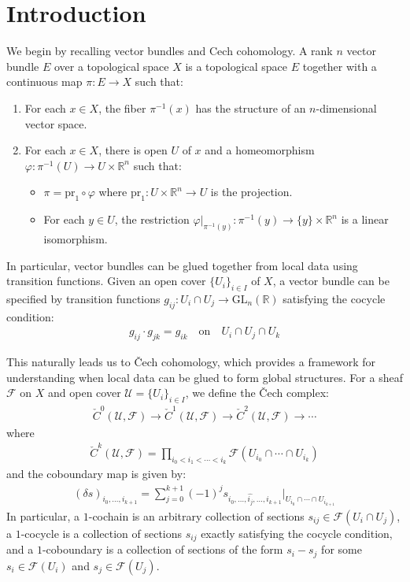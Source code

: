 \documentclass[12pt]{article}
\begin{document}
\section{Introduction}
We begin by recalling vector bundles and Cech cohomology. A rank $n$ vector bundle $E$ over a topological space $X$ is a topological space $E$ together with a continuous map $\pi: E \to X$ such that:
\begin{enumerate}
    \item For each $x \in X$, the fiber $\pi^{-1}(x)$ has the structure of an $n$-dimensional vector space.
    \item For each $x \in X$, there is open $U$ of $x$ and a homeomorphism $\varphi: \pi^{-1}(U) \to U \times \mathbb{R}^n$ such that:
          \begin{itemize}
              \item $\pi = \text{pr}_1 \circ \varphi$ where $\text{pr}_1: U \times \mathbb{R}^n \to U$ is the projection.
              \item For each $y \in U$, the restriction $\varphi|_{\pi^{-1}(y)}: \pi^{-1}(y) \to \{y\} \times \mathbb{R}^n$ is a linear isomorphism.
          \end{itemize}
\end{enumerate}

In particular, vector bundles can be glued together from local data using transition functions. Given an open cover $\{U_i\}_{i \in I}$ of $X$, a vector bundle can be specified by transition functions $g_{ij}: U_i \cap U_j \to \text{GL}_n(\mathbb{R})$ satisfying the cocycle condition:
\begin{align*}
    g_{ij} \cdot g_{jk} = g_{ik} \quad \text{on} \quad U_i \cap U_j \cap U_k
\end{align*}

This naturally leads us to Čech cohomology, which provides a framework for understanding when local data can be glued to form global structures. For a sheaf $\mathcal{F}$ on $X$ and open cover $\mathcal{U} = \{U_i\}_{i \in I}$, we define the Čech complex:
\begin{align*}
    \check{C}^0(\mathcal{U}, \mathcal{F}) \to \check{C}^1(\mathcal{U}, \mathcal{F}) \to \check{C}^2(\mathcal{U}, \mathcal{F}) \to \cdots
\end{align*} where
\begin{align*}
    \check{C}^k(\mathcal{U}, \mathcal{F}) = \prod_{i_0 < i_1 < \cdots < i_k} \mathcal{F}(U_{i_0} \cap \cdots \cap U_{i_k})
\end{align*} and the coboundary map is given by:
\begin{align*}
    (\delta s)_{i_0, \ldots, i_{k+1}} = \sum_{j=0}^{k+1} (-1)^j s_{i_0, \ldots, \hat{i_j}, \ldots, i_{k+1}}|_{U_{i_0} \cap \cdots \cap U_{i_{k+1}}}
\end{align*}
In particular, a $1$-cochain is an arbitrary collection of sections $s_{ij} \in \mathcal{F}(U_i \cap U_j)$, a $1$-cocycle is a collection of sections $s_{ij}$ exactly satisfying the cocycle condition, and a $1$-coboundary is a collection of sections of the form $s_i - s_j$ for some $s_i \in \mathcal{F}(U_i)$ and $s_j \in \mathcal{F}(U_j)$.
\end{document}

